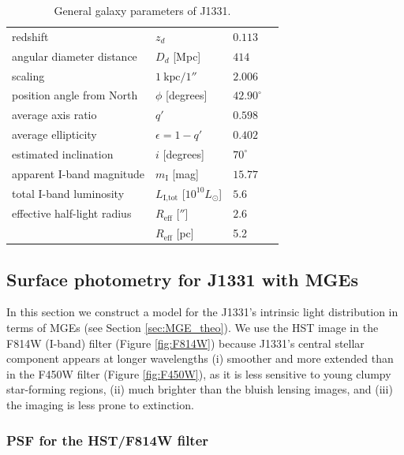 \documentclass[useAMS,usenatbib]{mnras}
\begin{document}
\begin{table}
\centering
\caption{General galaxy parameters of J1331.}
\begin{tabular}{lllr}
\hline
redshift \citep{SWELLSIII}                 & $z_d$ & $0.113$ \\
angular diameter distance & $D_d$ [Mpc] & $414$ \\
scaling                   & $1~\text{kpc} / 1''$ & $2.006$ \\
position angle from North          & $\phi$ [degrees] & $42.90^\circ$\\
average axis ratio & $q'$ & $0.598$\\
average ellipticity & $\epsilon = 1 - q'$ & $0.402$ \\
estimated inclination & $i$ [degrees] & $70^\circ$\\
apparent I-band magnitude & $m_\text{I}$ [mag] & $15.77$ \\
total I-band luminosity & $L_\text{I,tot}$ [$10^{10} L_\odot$] & $5.6$ \\
effective half-light radius & $R_\text{eff}$ [$''$] & $2.6$ \\
& $R_\text{eff}$ [pc]& 5.2 & \\
\hline
\end{tabular}
\label{tab:galaxyparameters}
\end{table}

\subsection{Surface photometry for J1331 with MGEs} \label{sec:MGE_results}

In this section we construct a model for the J1331's intrinsic light distribution in terms of MGEs (see Section \ref{sec:MGE_theo}). We use the HST image in the F814W (I-band) filter (Figure \ref{fig:F814W}) because J1331's central stellar component appears at longer wavelengths (i) smoother and more extended than in the F450W filter (Figure \ref{fig:F450W}), as it is less sensitive to young clumpy star-forming regions, (ii) much brighter than the bluish lensing images, and (iii) the imaging is less prone to extinction.

\subsubsection{PSF for the HST/F814W filter}
\end{document}

